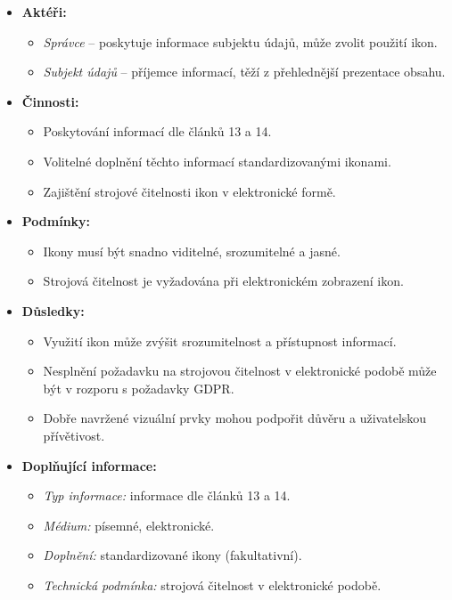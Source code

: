 \begin{itemize}
\item \textbf{Aktéři:}
\begin{itemize}
\item \textit{Správce} – poskytuje informace subjektu údajů, může zvolit použití ikon.
\item \textit{Subjekt údajů} – příjemce informací, těží z přehlednější prezentace obsahu.
\end{itemize}

\item \textbf{Činnosti:}
\begin{itemize}
\item Poskytování informací dle článků 13 a 14.
\item Volitelné doplnění těchto informací standardizovanými ikonami.
\item Zajištění strojové čitelnosti ikon v elektronické formě.
\end{itemize}

\item \textbf{Podmínky:}
\begin{itemize}
\item Ikony musí být snadno viditelné, srozumitelné a jasné.
\item Strojová čitelnost je vyžadována při elektronickém zobrazení ikon.
\end{itemize}

\item \textbf{Důsledky:}
\begin{itemize}
\item Využití ikon může zvýšit srozumitelnost a přístupnost informací.
\item Nesplnění požadavku na strojovou čitelnost v elektronické podobě může být v rozporu s požadavky GDPR.
\item Dobře navržené vizuální prvky mohou podpořit důvěru a uživatelskou přívětivost.
\end{itemize}

\item \textbf{Doplňující informace:}
\begin{itemize}
\item \textit{Typ informace:} informace dle článků 13 a 14.
\item \textit{Médium:} písemné, elektronické.
\item \textit{Doplnění:} standardizované ikony (fakultativní).
\item \textit{Technická podmínka:} strojová čitelnost v elektronické podobě.
\end{itemize}
\end{itemize}

